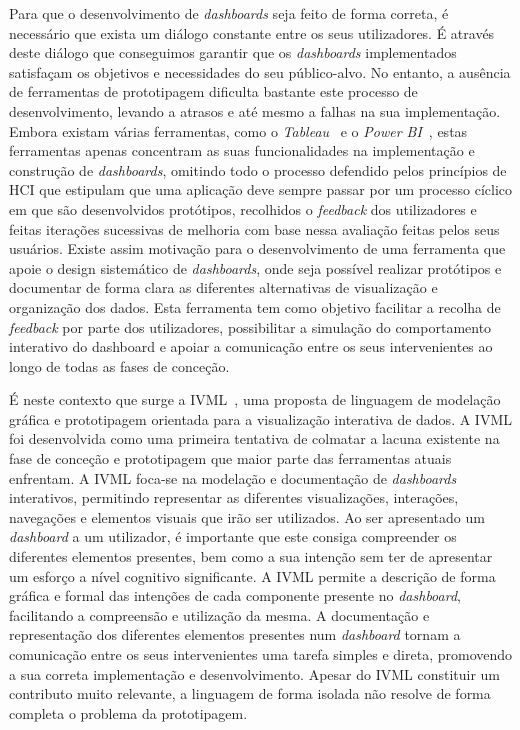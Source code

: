 Para que o desenvolvimento de \textit{dashboards} seja feito de forma correta, é necessário que exista um diálogo constante entre os seus utilizadores. É através deste diálogo que conseguimos garantir que os \textit{dashboards} implementados satisfaçam os objetivos e necessidades do seu público-alvo. No entanto, a ausência de ferramentas de prototipagem dificulta bastante este processo de desenvolvimento, levando a atrasos e até mesmo a falhas na sua implementação. Embora existam várias ferramentas, como o \textit{Tableau}~\cite{tableau} e o \textit{Power BI}~\cite{powerBI}, estas ferramentas apenas concentram as suas funcionalidades na implementação e construção de \textit{dashboards}, omitindo todo o processo defendido pelos princípios de \gls{HCI} que estipulam que uma aplicação deve sempre passar por um processo cíclico em que são desenvolvidos protótipos, recolhidos o \textit{feedback} dos utilizadores e feitas iterações sucessivas de melhoria com base nessa avaliação feitas pelos seus usuários. Existe assim motivação para o desenvolvimento de uma ferramenta que apoie o design sistemático de \textit{dashboards}, onde seja possível realizar protótipos e documentar de forma clara as diferentes alternativas de visualização e organização dos dados. Esta ferramenta tem como objetivo facilitar a recolha de \textit{feedback} por parte dos utilizadores, possibilitar a simulação do comportamento interativo do dashboard e apoiar a comunicação entre os seus intervenientes ao longo de todas as fases de conceção.

É neste contexto que surge a \gls{IVML}~\cite{Ferreira2023IVML}, uma proposta de linguagem de modelação gráfica e prototipagem orientada para a visualização interativa de dados. A \gls{IVML} foi desenvolvida como uma primeira tentativa de colmatar a lacuna existente na fase de conceção e prototipagem que maior parte das ferramentas atuais enfrentam. A \gls{IVML} foca-se na modelação e documentação de \textit{dashboards} interativos, permitindo representar as diferentes visualizações, interações, navegações e elementos visuais que irão ser utilizados. Ao ser apresentado um \textit{dashboard} a um utilizador, é importante que este consiga compreender os diferentes elementos presentes, bem como a sua intenção sem ter de apresentar um esforço a nível cognitivo significante. A \gls{IVML} permite a descrição de forma gráfica e formal das intenções de cada componente presente no \textit{dashboard}, facilitando a compreensão e utilização da mesma. A documentação e representação dos diferentes elementos presentes num \textit{dashboard} tornam a comunicação entre os seus intervenientes uma tarefa simples e direta, promovendo a sua correta implementação e desenvolvimento. Apesar do \gls{IVML} constituir um contributo muito relevante, a linguagem de forma isolada não resolve de forma completa o problema da prototipagem.

